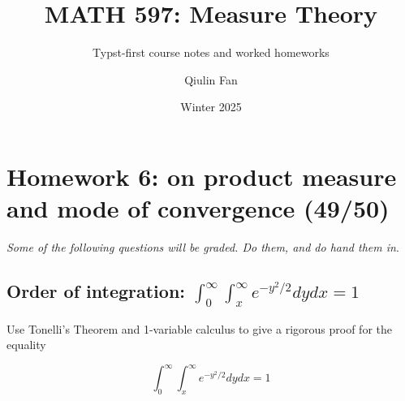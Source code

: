 \documentclass{qlnotes-export}
\title{MATH 597: Measure Theory}
\subtitle{Typst-first course notes and worked homeworks}
\author{Qiulin Fan}
\date{Winter 2025}
\begin{document}
\mainmatter
\chapter{Homework 6: on product measure and mode of convergence (49/50)}\label{homework-6-on-product-measure-and-mode-of-convergence-4950}

\emph{Some of the following questions will be graded. Do them, and do hand them in}.

\section{\texorpdfstring{Order of integration: \(\int_{0}^{\infty}\int_{x}^{\infty}e^{- y^{2}/2} dy dx = 1\)}{Order of integration: \textbackslash int\_\{0\}\^{}\{\textbackslash infty\}\textbackslash int\_\{x\}\^{}\{\textbackslash infty\}e\^{}\{- y\^{}\{2\}/2\} dy dx = 1}}\label{order-of-integration-int_0inftyint_xinfty-e-y22d-y-d-x1}

Use Tonelli's Theorem and 1-variable calculus to give a rigorous proof for the equality

\[\int_{0}^{\infty}\int_{x}^{\infty}e^{- y^{2}/2} dy dx = 1\]
\end{document}
